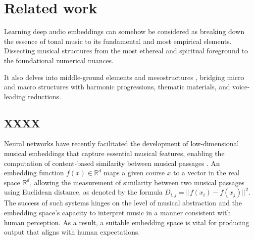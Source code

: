 \section{Related work}

Learning deep audio embeddings can somehow be considered as breaking down the essence of tonal music to its fundamental and most empirical elements. Dissecting musical structures from the most ethereal and spiritual foreground  to the foundational numerical nuances. 

It also delves into middle-ground elements and mesostructures \cite{Mesostructures2023}, bridging micro and macro structures with harmonic progressions, thematic materials, and voice-leading reductions. 

\subsection{XXXX}

Neural networks have recently facilitated the development of low-dimensional musical embeddings that capture essential musical features, enabling the computation of content-based similarity between musical passages \cite{Kim2021LearningLoss}\cite{Hung2022Feature-informedClassification}. An embedding function $f(x) \in \mathbb{R}^d$ maps a given course $x$ to a vector in the real space $\mathbb{R}^d$, allowing the measurement of similarity between two musical passages using Euclidean distance, as denoted by the formula $D_{i,j} = ||f(x_i) - f(x_j)||^2$. The success of such systems hinges on the level of musical abstraction and the embedding space's capacity to interpret music in a manner consistent with human perception. As a result, a suitable embedding space is vital for producing output that aligns with human expectations.
